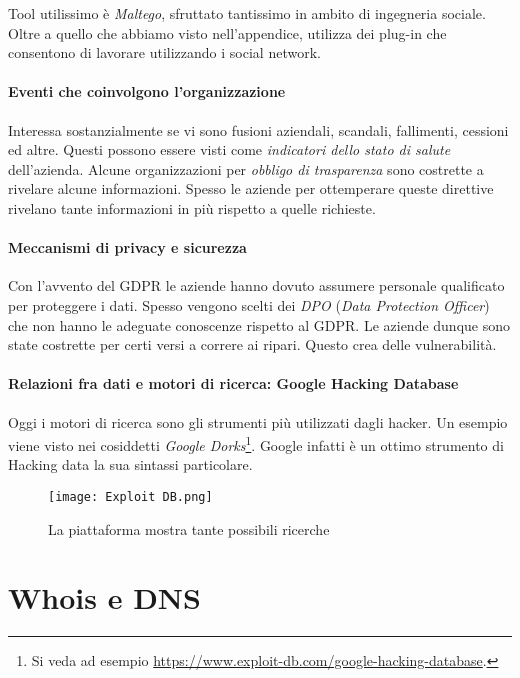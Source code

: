 \documentclass[14pt]{extreport}
\begin{document}
Tool utilissimo è \textit{Maltego}, sfruttato tantissimo in ambito di ingegneria sociale. Oltre a quello che abbiamo visto nell'appendice, utilizza dei plug-in che consentono di lavorare utilizzando i social network.



\paragraph{Eventi che coinvolgono l'organizzazione}
Interessa sostanzialmente se vi sono fusioni aziendali, scandali, fallimenti, cessioni ed altre. Questi possono essere visti come \textit{indicatori dello stato di salute} dell'azienda. Alcune organizzazioni per \textit{obbligo di trasparenza} sono costrette a rivelare alcune informazioni. Spesso le aziende per ottemperare queste direttive rivelano tante informazioni in più rispetto a quelle richieste.



\paragraph{Meccanismi di privacy e sicurezza}
Con l'avvento del GDPR le aziende hanno dovuto assumere personale qualificato per proteggere i dati. Spesso vengono scelti dei \textit{DPO} (\textit{Data Protection Officer}) che non hanno le adeguate conoscenze rispetto al GDPR. Le aziende dunque sono state costrette per certi versi a correre ai ripari. Questo crea delle vulnerabilità.

\paragraph{Relazioni fra dati e motori di ricerca: Google Hacking Database}
Oggi i motori di ricerca sono gli strumenti più utilizzati dagli hacker. Un esempio viene visto nei cosiddetti \textit{Google Dorks}\footnote{Si veda ad esempio \url{https://www.exploit-db.com/google-hacking-database}.}. Google infatti è un ottimo strumento di Hacking data la sua sintassi particolare.



\begin{figure}[H]
    \centering
    \texttt{[image: Exploit DB.png]}
    \caption{La piattaforma mostra tante possibili ricerche}
\end{figure}

\section{Whois e DNS}
\end{document}
